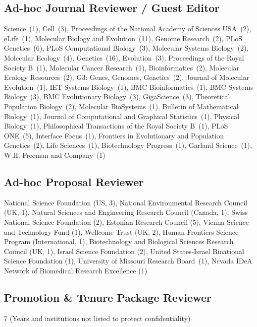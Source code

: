 \documentclass[11pt]{article}
\begin{document}
\subsection*{Ad-hoc Journal Reviewer / Guest Editor}
{Science~(1)},
{Cell~(3)},
{Proceedings of the National Academy of Sciences USA~(2)},
{eLife~(1)},
{Molecular Biology and Evolution~(11)},
{Genome Research~(2)},
{PLoS Genetics~(6)},
{PLoS Computational Biology~(3)},
{Molecular Systems Biology~(2)},
{Molecular Ecology~(4)},
{Genetics~(16)}, 
{Evolution~(3)}, 
{Proceedings of the Royal Society B~(1)},
{Molecular Cancer Research~(1)},
{Bioinformatics~(2)},
{Molecular Ecology Resources~(2)},
{G3: Genes, Genomes, Genetics~(2)},
{Journal of Molecular Evolution~(1)},
{IET Systems Biology~(1)}, 
{BMC Bioinformatics~(1)},
{BMC Systems Biology~(3)}, 
{BMC Evolutionary Biology~(3)},
{GigaScience~(3)},
{Theoretical Population Biology~(2)},
{Molecular BioSystems~(1)},
{Bulletin of Mathematical Biology~(1)},
{Journal of Computational and Graphical Statistics~(1)},
{Physical Biology~(1)},
{Philosophical Transactions of the Royal Society B~(1)},
{PLoS ONE~(5)},
{Interface Focus~(1)},
{Frontiers in Evolutionary and Population Genetics~(2)},
{Life Sciences~(1)},
{Biotechnology Progress~(1)},
{Garland Science~(1)},
{W.H. Freeman and Company~(1)}

\subsection*{Ad-hoc Proposal Reviewer}
National Science Foundation (US, 3), National Environmental Research Council (UK, 1), Natural Sciences and Engineering Research Council (Canada, 1), Swiss National Science Foundation (2), Estonian Research Council (5), Vienna Science and Technology Fund (1),
Wellcome Trust (UK, 2), Human Frontiers Science Program (International, 1), Biotechnology and Biological Sciences Research Council (UK, 1), Israel Science Foundation (2), United States-Israel Binational Science Foundation (1), University of Missouri Research Board~(1), Nevada IDeA Network of Biomedical Research Excellence (1)

\subsection*{Promotion \& Tenure Package Reviewer}
7 (Years and institutions not listed to protect confidentiality)


\newenvironment{hanglist}[1][\parindent]{%
    \begin{list}{}{%
        \setlength{\leftmargin}{#1}
        \setlength{\labelwidth}{0pt}
        \setlength{\labelsep}{0pt}
        \setlength{\itemindent}{-#1}
        \setlength{\topsep}{0pt}
        \setlength{\partopsep}{0pt}
        \setlength{\parsep}{0pt}
        \setlength{\itemsep}{0pt}}
    }{%
        \end{list}
    }
\end{document}
